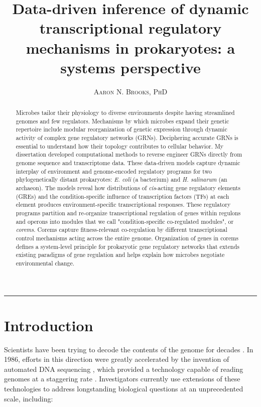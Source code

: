 \documentclass{article}
\title{\vspace{-15mm}\fontsize{20pt}{10pt}\selectfont\textbf{Data-driven inference of dynamic transcriptional regulatory mechanisms in prokaryotes: a systems perspective}} %
\author{
\large
{\textsc{ Aaron N. Brooks, PhD }}
}
\date{}
\begin{document}
\sansmath
\maketitle %
\thispagestyle{fancy} %

\vspace{-5mm}\rule{\textwidth}{1pt}

\begin{abstract}
\noindent Microbes tailor their physiology to diverse environments despite having streamlined genomes and few regulators. Mechanisms by which microbes expand their genetic repertoire include modular reorganization of genetic expression through dynamic activity of complex gene regulatory networks (GRNs). Deciphering accurate GRNs is essential to understand how their topology contributes to cellular behavior. My dissertation developed computational methods to reverse engineer GRNs directly from genome sequence and transcriptome data. These data-driven models capture dynamic interplay of environment and genome-encoded regulatory programs for two phylogenetically distant prokaryotes: \textit{E. coli} (a bacterium) and \textit{H. salinarum} (an archaeon). The models reveal how distributions of \textit{cis}-acting gene regulatory elements (GREs) and the condition-specific influence of transcription factors (TFs) at each element produces environment-specific transcriptional responses. These regulatory programs partition and re-organize transcriptional regulation of genes within regulons and operons into modules that we call "condition-specific co-regulated modules", or \textit{corems}. Corems capture fitness-relevant co-regulation by different transcriptional control mechanisms acting across the entire genome. Organization of genes in corems defines a system-level principle for prokaryotic gene regulatory networks that extends existing paradigms of gene regulation and helps explain how microbes negotiate environmental change.
\end{abstract}

\section{Introduction}

Scientists have been trying to decode the contents of the genome for decades \cite{watson_molecular_1953}. In 1986, efforts in this direction were greatly accelerated by the invention of automated DNA sequencing \cite{smith_fluorescence_1986}, which provided a technology capable of reading genomes at a staggering rate \cite{check_hayden_technology:_2014}. Investigators currently use extensions of these technologies to address longstanding biological questions at an unprecedented scale, including: 
\end{document}

